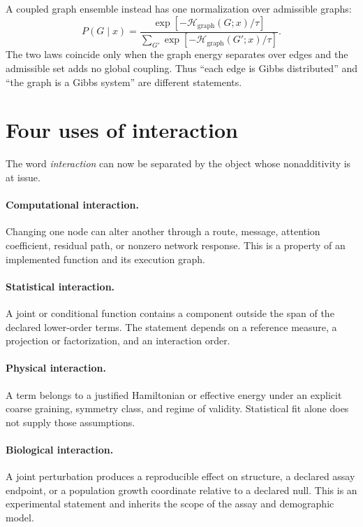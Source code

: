 A coupled graph ensemble instead has one normalization over admissible graphs:
\begin{equation}
P(G\mid x)
=\frac{\exp[-\mathcal H_{\mathrm{graph}}(G;x)/\tau]}
{\sum_{G'}\exp[-\mathcal H_{\mathrm{graph}}(G';x)/\tau]}.
\label{eq:book-global-graph-law}
\end{equation}
The two laws coincide only when the graph energy separates over edges and the admissible set adds
no global coupling.  Thus ``each edge is Gibbs distributed'' and ``the graph is a Gibbs system''
are different statements.

\section{Four uses of interaction}

The word \emph{interaction} can now be separated by the object whose nonadditivity is at issue.

\paragraph{Computational interaction.}
Changing one node can alter another through a route, message, attention coefficient, residual
path, or nonzero network response.  This is a property of an implemented function and its
execution graph.

\paragraph{Statistical interaction.}
A joint or conditional function contains a component outside the span of the declared lower-order
terms.  The statement depends on a reference measure, a projection or factorization,
and an interaction order.

\paragraph{Physical interaction.}
A term belongs to a justified Hamiltonian or effective energy under an explicit coarse graining,
symmetry class, and regime of validity.  Statistical fit alone does not supply those assumptions.

\paragraph{Biological interaction.}
A joint perturbation produces a reproducible effect on structure, a declared assay endpoint, or a
population growth coordinate relative to a declared null.  This is an experimental statement and
inherits the scope of the assay and demographic model.

